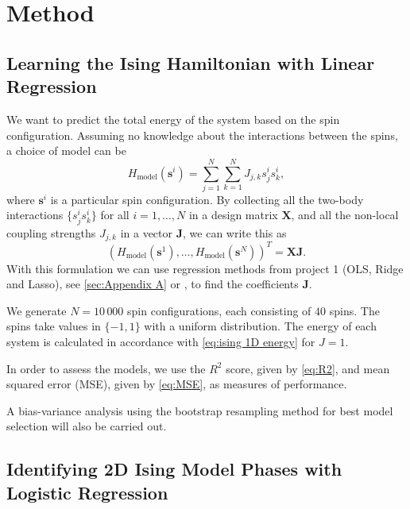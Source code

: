 \section{Method}\label{sec:Method}

\subsection{Learning the Ising Hamiltonian with Linear Regression}\label{sec:method linreg}
We want to predict the total energy of the system based on the spin configuration. Assuming no knowledge about the interactions between the spins, a choice of model can be
\begin{equation}\label{eq:general}
    H_{\text{model}}(\mathbf{s}^i) = \sum_{j=1}^N\sum_{k=1}^N J_{j,k}s_j^is_k^i,
\end{equation}
where $\mathbf{s}^i$ is a particular spin configuration. By collecting all the two-body interactions $\{s_j^is_k^i\}$ for all $i=1,\ldots,N$ in a design matrix $\mathbf{X}$, and all the non-local coupling strengths $J_{j,k}$ in a vector $\mathbf{J}$, we can write this as
\begin{equation*}
    (H_{\text{model}}(\mathbf{s}^1), \ldots, H_{\text{model}}(\mathbf{s}^N))^T = \mathbf{X}\mathbf{J}.
\end{equation*}
With this formulation we can use regression methods from project 1 (OLS, Ridge and Lasso), see \autoref{sec:Appendix A} or \cite{PROJone}, to find the coefficients $\mathbf{J}$.

We generate $N = 10\,000$ spin configurations, each consisting of $40$ spins. The spins take values in $\{-1,1\}$ with a uniform distribution. The energy of each system is calculated in accordance with \cref{eq:ising 1D energy} for $J=1$.

In order to assess the models, we use the $R^2$ score, given by \autoref{eq:R2}, and mean squared error (MSE), given by \autoref{eq:MSE}, as measures of performance. 

A bias-variance analysis using the bootstrap resampling method for best model selection will also be carried out.

\subsection{Identifying 2D Ising Model Phases with Logistic Regression}\label{sec:method logreg}

